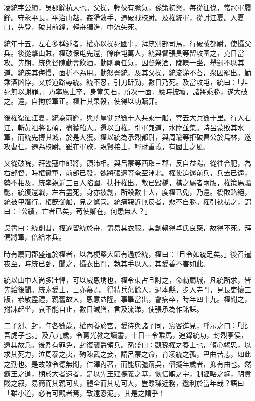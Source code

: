 
\begin{pinyinscope}
凌統字公績，吳郡餘杭人也。父操，輕俠有膽氣，孫策初興，每從征伐，常冠軍履鋒。守永平長，平治山越，姦猾斂手，遷破賊校尉。及權統軍，從討江夏。入夏口，先登，破其前鋒，輕舟獨進，中流矢死。

統年十五，左右多稱述者，權亦以操死國事，拜統別部司馬，行破賊都尉，使攝父兵。後從擊山賊，權破保屯先還，餘麻屯萬人，統與督張異等留攻圍之，克日當攻。先期，統與督陳勤會飲酒，勤剛勇任氣，因督祭酒，陵轢一坐，舉罰不以其道。統疾其侮慢，靣折不為用。勤怒詈統，及其父操，統流涕不荅，衆因罷出。勤乘酒凶悖，又於道路辱統。統不忍，引刀斫勤，數日乃死。及當攻屯，統曰：「非死無以謝罪。」乃率厲士卒，身當矢石，所次一靣，應時披壞，諸將乘勝，遂大破之。還，自拘於軍正。權壯其果毅，使得以功贖罪。

後權復征江夏，統為前鋒，與所厚健兒數十人共乘一船，常去大兵數十里。行入右江，斬黃祖將張碩，盡獲船人。還以白權，引軍兼道，水陸並集。時呂蒙敗其水軍，而統先搏其城，於是大獲。權以統為承烈都尉，與周瑜等拒破曹公於烏林，遂攻曹仁，遷為校尉。雖在軍旅，親賢接士，輕財重義，有國士之風。

又從破皖，拜盪寇中郎將，領沛相。與呂蒙等西取三郡，反自益陽，從往合肥，為右部督。時權徹軍，前部已發，魏將張遼等奄至津北。權使追還前兵，兵去已遠，勢不相及，統率親近三百人陷圍，扶扞權出。敵已毀橋，橋之屬者兩版，權策馬驅馳，統復還戰，左右盡死，身亦被創，所殺數十人，度權已免，乃還。橋敗路絕，統被甲潛行。權旣御船，見之驚喜。統痛親近無反者，悲不自勝。權引袂拭之，謂曰：「公績，亡者已矣，苟使卿在，何患無人？」

吳書曰：統創甚，權遂留統於舟，盡易其衣服。其創賴得卓氏良藥，故得不死。拜偏將軍，倍給本兵。

時有薦同郡盛暹於權者，以為梗槩大節有過於統，權曰：「且令如統足矣。」後召暹夜至，時統已卧，聞之，攝衣出門，執其手以入。其愛善不害如此。

統以山中人尚多壯悍，可以威恩誘也，權令東占且討之，命勑屬城，凡統所求，皆先給後聞。統素愛士，士亦慕焉。得精兵萬餘人，過本縣，步入寺門，見長吏懷三版，恭敬盡禮，親舊故人，恩意益隆。事畢當出，會病卒，時年四十九。權聞之，拊牀起坐，哀不能自止，數日減膳，言及流涕，使張承為作銘誄。

二子烈、封，年各數歲，權內養於宮，愛待與諸子同，賔客進見，呼示之曰：「此吾虎子也。」及八九歲，令葛光教之讀書，十日一令乘馬，追錄統功，封烈亭侯，還其故兵。後烈有罪免，封復襲爵領兵。孫盛曰：觀孫權之養士也，傾心竭思，以求其死力，泣周泰之夷，殉陳武之妾，請呂蒙之命，育凌統之孤，卑曲苦志，如此之勤也。是故雖令德無聞，仁澤內著，而能屈彊荊吳，僭擬年歲者，抑有由也。然霸王之道，期於大者遠者，是以先王建德義之基，恢信順之宇，制經略之綱，明貴賤之叙，易簡而其親可乆，體全而其功可大，豈踒璅近務，邀利於當年哉？語曰「雖小道，必有可觀者焉，致遠恐泥」，其是之謂乎！


\end{pinyinscope}